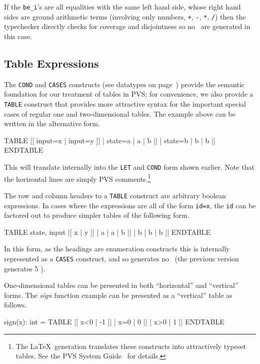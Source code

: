 If the {\tt be\_i}'s are all equalities with the same left hand side,
whose right hand sides are ground arithmetic terms (involving only
numbers, \texttt{+}, \texttt{-}, \texttt{*}, \texttt{/}) then the typechecker
directly checks for coverage and disjointness so no \tccs\ are generated
in this case.



\subsection{Table Expressions}

The {\tt COND} and {\tt CASES} constructs (see datatypes on page~\pageref{datatypes}) provide the semantic
foundation for our treatment of tables in PVS; for convenience, we
also provide a {\tt TABLE} construct that provides more attractive
syntax for the important special cases of regular one and
two-dimensional tables.  The example above can be written in the
alternative form.
\begin{pvsex}
   TABLE
               |[ input=x | input=y ]|
      | state=a |    a    |    b    ||
      | state=b |    b    |    b    ||
   ENDTABLE
\end{pvsex}
This will translate internally into the {\tt LET} and {\tt COND} form
shown earlier.  Note that the horizontal lines are simply PVS
comments.\footnote{The \LaTeX\ generation translates these constructs into attractively
typeset tables.  See the PVS System Guide~\cite{PVS:userguide} for details.}

The row and column headers to a {\tt TABLE} construct are arbitrary
boolean expressions.   In cases where the expressions are all of the
form {\tt id=x}, the {\tt id} can be factored out to produce simpler
tables of the following form.
\begin{pvsex}
   TABLE state,    input
               |[ x | y ]|
         |  a   | a | b ||
         |  b   | b | b ||
   ENDTABLE
\end{pvsex}
In this form, as the headings are enumeration constructs this is
internally represented as a \texttt{CASES} construct, and so generates
no \tccs\ (the previous version generates 5 \tccs).

One-dimensional tables can be presented in both ``horizontal'' and
``vertical'' forms.  The \emph{sign} function example can be
presented as a ``vertical'' table as follows.
\begin{pvsex}
  sign(x): int = TABLE 
                |[ x<0 | -1 ]|
                 | x=0 |  0 ||
                 | x>0 |  1 ||
   ENDTABLE
\end{pvsex}

